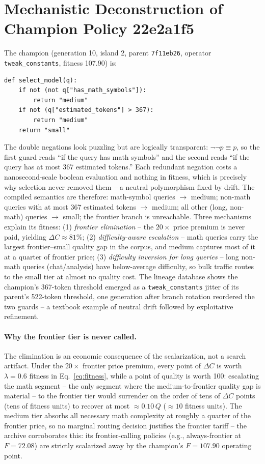 \documentclass[11pt]{article}
\begin{document}
\section{Mechanistic Deconstruction of Champion Policy 22e2a1f5}
The champion (generation 10, island 2, parent \texttt{7f11eb26}, operator \texttt{tweak\_constants}, fitness 107.90) is:
\begin{verbatim}
def select_model(q):
    if not (not q["has_math_symbols"]):
        return "medium"
    if not (q["estimated_tokens"] > 367):
        return "medium"
    return "small"
\end{verbatim}
The double negations look puzzling but are logically transparent: $\neg\neg p \equiv p$, so the first guard reads ``if the query has math symbols'' and the second reads ``if the query has at most 367 estimated tokens.'' Each redundant negation costs a nanosecond-scale boolean evaluation and nothing in fitness, which is precisely why selection never removed them -- a neutral polymorphism fixed by drift. The compiled semantics are therefore: math-symbol queries $\to$ medium; non-math queries with at most 367 estimated tokens $\to$ medium; all other (long, non-math) queries $\to$ small; the frontier branch is unreachable. Three mechanisms explain its fitness: (1) \emph{frontier elimination} -- the $20\times$ price premium is never paid, yielding $\Delta C \approx 81\%$; (2) \emph{difficulty-aware escalation} -- math queries carry the largest frontier--small quality gap in the corpus, and medium captures most of it at a quarter of frontier price; (3) \emph{difficulty inversion for long queries} -- long non-math queries (chat/analysis) have below-average difficulty, so bulk traffic routes to the small tier at almost no quality cost. The lineage database shows the champion's 367-token threshold emerged as a \texttt{{tweak\_constants}} jitter of its parent's 522-token threshold, one generation after branch rotation reordered the two guards -- a textbook example of neutral drift followed by exploitative refinement.
\paragraph{Why the frontier tier is never called.} The elimination is an economic consequence of the scalarization, not a search artifact. Under the $20\times$ frontier price premium, every point of $\Delta C$ is worth $\lambda = 0.6$ fitness in Eq.~\eqref{eq:fitness}, while a point of quality is worth 100: escalating the math segment -- the only segment where the medium-to-frontier quality gap is material -- to the frontier tier would surrender on the order of tens of $\Delta C$ points (tens of fitness units) to recover at most $\approx 0.10\,Q$ ($\approx 10$ fitness units). The medium tier absorbs all necessary math complexity at roughly a quarter of the frontier price, so no marginal routing decision justifies the frontier tariff -- the archive corroborates this: its frontier-calling policies (e.g., always-frontier at $F=72.08$) are strictly scalarized away by the champion's $F=107.90$ operating point.
\end{document}
